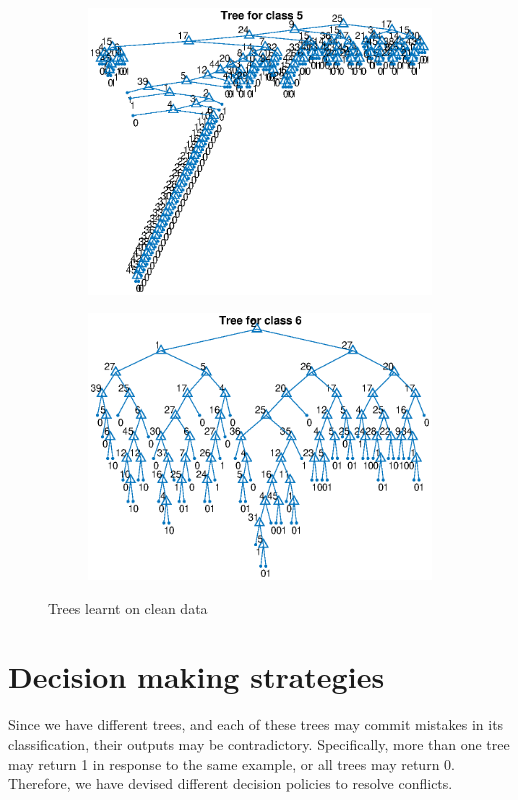 \documentclass{article}
\begin{document}
\begin{figure}
\begin{subfigure}[b]{.49\textwidth}
   \includegraphics[width=\textwidth]{tree5.eps}
 \end{subfigure}
 \begin{subfigure}[b]{.49\textwidth}
   \includegraphics[width=\textwidth]{tree6.eps}
 \end{subfigure}
 \caption{Trees learnt on clean data}
 \label{fig:trees}
\end{figure}

\section{Decision making strategies}
\label{sec:decision_strategies}
Since we have different trees, and each of these trees may commit mistakes in its classification, their outputs may be contradictory. Specifically, more than one tree may return 1 in response to the same example, or all trees may return 0. Therefore, we have devised different decision policies to resolve conflicts.
\end{document}
